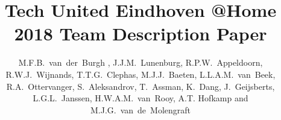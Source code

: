 \documentclass[runningheads,a4paper]{llncs}
\begin{document}
\setlength{\headheight}{22pt}

\title{Tech United Eindhoven @Home \\2018 Team Description Paper}

\author{M.F.B.~van~der~Burgh , J.J.M.~Lunenburg, R.P.W.~Appeldoorn, R.W.J.~Wijnands,
T.T.G.~Clephas, M.J.J.~Baeten, L.L.A.M.~van~Beek, R.A.~Ottervanger,
S.~Aleksandrov, T.~Assman, K.~Dang, J.~Geijsberts, L.G.L.~Janssen,
H.W.A.M.~van~Rooy, A.T. Hofkamp and M.J.G.~van~de~Molengraft}



\end{document}

